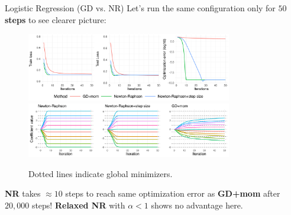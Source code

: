 \documentclass[11pt,compress,t,notes=noshow, xcolor=table]{beamer}
\begin{document}
\begin{vbframe}{Logistic Regression (GD vs. NR)}
\vspace{-0.4cm}
Let's run the same configuration only for \textbf{$50$ steps} to see clearer picture:
\begin{figure}
            \includegraphics[width=0.8\textwidth]{figure_man/simu-newton/NR_GD_log_indep_50iters.pdf} \\
             \includegraphics[width=0.8\textwidth]{figure_man/simu-newton/NR_GD_log_coef_50indep.pdf}\\
            \begin{footnotesize}
            Dotted lines indicate global minimizers.
            \end{footnotesize}
\end{figure}
\textbf{NR} takes $\approx 10$ steps to reach same optimization error as \textbf{GD+mom} after $20,000$ steps! \textbf{Relaxed NR} with $\alpha<1$ shows no advantage here.
\end{vbframe}
\end{document}
